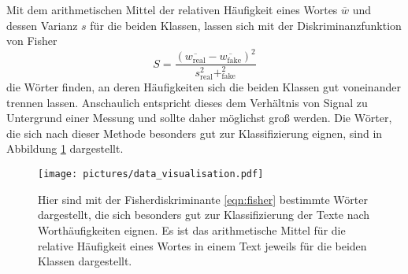 Mit dem arithmetischen Mittel der relativen Häufigkeit eines Wortes $\overline{w}$
und dessen Varianz $s$ für die beiden Klassen, lassen sich mit der Diskriminanzfunktion von Fisher 
\begin{equation}
    \label{eqn:fisher}
    S = \frac{(\overline{w_{\text{real}}} - \overline{w_{\text{fake}}})^2}{s_{\text{real}}^2+_{\text{fake}}^2}
\end{equation}
die Wörter finden, an deren Häufigkeiten sich die beiden Klassen gut voneinander trennen
lassen. Anschaulich entspricht dieses dem Verhältnis von Signal zu Untergrund einer Messung und sollte
daher möglichst groß werden. Die Wörter, die sich nach dieser Methode besonders gut zur Klassifizierung
eignen, sind in Abbildung \ref{fig:fisher_hist} dargestellt.

\begin{figure}
    \centering
    \texttt{[image: pictures/data\_visualisation.pdf]}
    \caption{Hier sind mit der Fisherdiskriminante \eqref{eqn:fisher} bestimmte
    Wörter dargestellt, die sich besonders gut zur Klassifizierung der Texte nach 
    Worthäufigkeiten eignen. Es ist das arithmetische Mittel für die relative Häufigkeit
    eines Wortes in einem Text jeweils für die beiden Klassen dargestellt. }
    \label{fig:fisher_hist}
\end{figure}